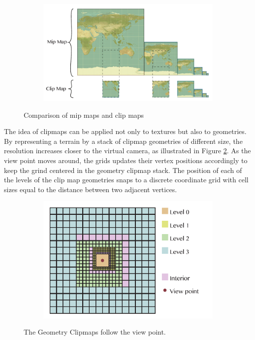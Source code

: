 \begin{figure}[htbp]
    \centering
    \begin{subfigure}[bt]{0.8\textwidth}
        \includegraphics[width=\textwidth]{figures/geometryclipmap/clipmap_mipmap.pdf}
    \end{subfigure}
    \caption{Comparison of mip maps and clip maps}
    \label{fig:clipmapmipmap}
\end{figure}

The idea of clipmaps can be applied not only to textures but also to geometries. By representing a terrain by a stack of clipmap geometries of different size, the resolution increases closer to the virtual camera, as illustrated in Figure \ref{fig:clipmapgeometry}. As the view point moves around, the grids updates their vertex positions accordingly to keep the grind centered in the geometry clipmap stack. The position of each of the levels of the clip map geometries snaps to a discrete coordinate grid with cell sizes equal to the distance between two adjacent vertices.

\begin{figure}[htbp]
    \centering
    \begin{subfigure}[bt]{0.6\textwidth}
        \includegraphics[width=\textwidth]{figures/geometryclipmap/clipmap_geo.pdf}
    \end{subfigure}
    \caption{The Geometry Clipmaps follow the view point.}
    \label{fig:clipmapgeometry}
\end{figure}

